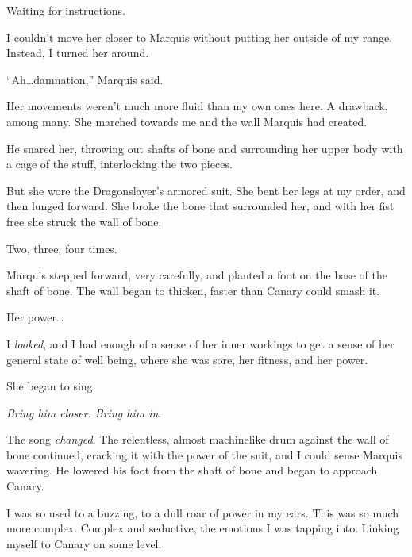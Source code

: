 Waiting for instructions.



I couldn't move her closer to Marquis without putting her outside of my range.  Instead, I turned her around.



``Ah\ldots damnation,'' Marquis said.



Her movements weren't much more fluid than my own ones here.  A drawback, among many.  She marched towards me and the wall Marquis had created.



He snared her, throwing out shafts of bone and surrounding her upper body with a cage of the stuff, interlocking the two pieces.



But she wore the Dragonslayer's armored suit.  She bent her legs at my order, and then lunged forward.  She broke the bone that surrounded her, and with her fist free she struck the wall of bone.



Two, three, four times.



Marquis stepped forward, very carefully, and planted a foot on the base of the shaft of bone.  The wall began to thicken, faster than Canary could smash it.



Her power\ldots



I \emph{looked}, and I had enough of a sense of her inner workings to get a sense of her general state of well being, where she was sore, her fitness, and her power.



She began to sing.



\emph{Bring him closer.  Bring him in}.



The song \emph{changed}.  The relentless, almost machinelike drum against the wall of bone continued, cracking it with the power of the suit, and I could sense Marquis wavering.  He lowered his foot from the shaft of bone and began to approach Canary.



I was so used to a buzzing, to a dull roar of power in my ears.  This was so much more complex.  Complex and seductive, the emotions I was tapping into.  Linking myself to Canary on some level.




